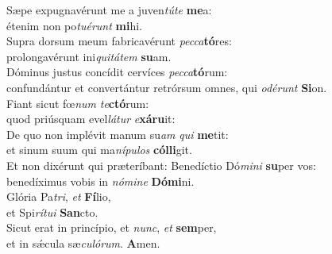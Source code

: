 \evenverse Sæpe expugnavérunt me a juven\textit{tú}\textit{te} \textbf{me}a:~\*\\
\evenverse étenim non po\textit{tu}\textit{é}\textit{runt} \textbf{mi}hi.\\
\oddverse Supra dorsum meum fabricavérunt \textit{pec}\textit{ca}\textbf{tó}res:~\*\\
\oddverse prolongavérunt ini\textit{qui}\textit{tá}\textit{tem} \textbf{su}am.\\
\evenverse Dóminus justus concídit cervíces \textit{pec}\textit{ca}\textbf{tó}rum:~\*\\
\evenverse confundántur et convertántur retrórsum omnes, qui \textit{o}\textit{dé}\textit{runt} \textbf{Si}on.\\
\oddverse Fiant sicut fœ\textit{num} \textit{te}\textbf{ctó}rum:~\*\\
\oddverse quod priúsquam evel\textit{lá}\textit{tur} \textit{e}\textbf{xá}\textbf{ru}it:\\
\evenverse De quo non implévit manum su\textit{am} \textit{qui} \textbf{me}tit:~\*\\
\evenverse et sinum suum qui ma\textit{ní}\textit{pu}\textit{los} \textbf{cól}\textbf{li}git.\\
\oddverse Et non dixérunt qui præteríbant: Benedíctio Dó\textit{mi}\textit{ni} \textbf{su}per vos:~\*\\
\oddverse benedíximus vobis in \textit{nó}\textit{mi}\textit{ne} \textbf{Dó}\textbf{mi}ni.\\
\evenverse Glória Pa\textit{tri}, \textit{et} \textbf{Fí}lio,~\*\\
\evenverse et Spi\textit{rí}\textit{tu}\textit{i} \textbf{San}cto.\\
\oddverse Sicut erat in princípio, et \textit{nunc}, \textit{et} \textbf{sem}per,~\*\\
\oddverse et in sǽcula sæ\textit{cu}\textit{ló}\textit{rum}. \textbf{A}men.\\
